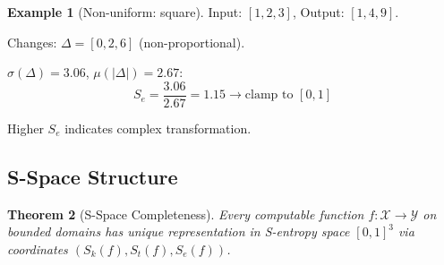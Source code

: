 \documentclass[twocolumn,10pt]{revtex4-2}
\newtheorem{theorem}{Theorem}[section]
\theoremstyle{definition}
\newtheorem{example}[theorem]{Example}
\theoremstyle{remark}
\newcommand{\Sk}{S_k}
\newcommand{\St}{S_t}
\newcommand{\Se}{S_e}
\begin{document}
\begin{example}[Non-uniform: square]
Input: $[1,2,3]$, Output: $[1,4,9]$.

Changes: $\Delta = [0,2,6]$ (non-proportional).

$\sigma(\Delta) = 3.06$, $\mu(|\Delta|) = 2.67$:
\begin{equation}
\Se = \frac{3.06}{2.67} = 1.15 \to \text{clamp to } [0,1]
\end{equation}

Higher $\Se$ indicates complex transformation.
\end{example}

\subsection{S-Space Structure}

\begin{theorem}[S-Space Completeness]
\label{thm:s_space_structure}
Every computable function $f: \mathcal{X} \to \mathcal{Y}$ on bounded domains has unique representation in S-entropy space $[0,1]^3$ via coordinates $(\Sk(f), \St(f), \Se(f))$.
\end{theorem}
\end{document}
